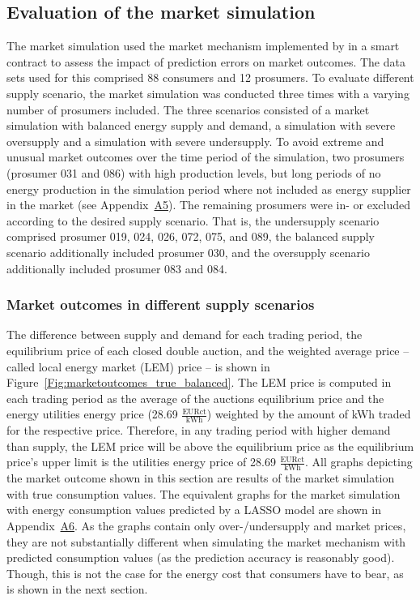 
\subsection{Evaluation of the market simulation}\label{Sec:Results;Subsec:Simulation}

The market simulation used the market mechanism implemented by \citet{Mengelkamp:2018a} in a smart contract to assess the impact of prediction errors on market outcomes. The data sets used for this comprised 88 consumers and 12 prosumers. To evaluate different supply scenario, the market simulation was conducted three times with a varying number of prosumers included. The three scenarios consisted of a market simulation with balanced energy supply and demand, a simulation with severe oversupply and a simulation with severe undersupply. To avoid extreme and unusual market outcomes over the time period of the simulation, two prosumers (prosumer 031 and 086) with high production levels, but long periods of no energy production in the simulation period where not included as energy supplier in the market (see Appendix~\hyperlink{AppA5:Figures:producer_all}{A5}). The remaining prosumers were in- or excluded according to the desired supply scenario. That is, the undersupply scenario comprised prosumer 019, 024, 026, 072, 075, and 089, the balanced supply scenario additionally included prosumer 030, and the oversupply scenario additionally included prosumer 083 and 084.

\subsubsection{Market outcomes in different supply scenarios}

The difference between supply and demand for each trading period, the equilibrium price of each closed double auction, and the weighted average price -- called local energy market (LEM) price -- is shown in Figure~\ref{Fig:marketoutcomes_true_balanced}. The LEM price is computed in each trading period as the average of the auctions equilibrium price and the energy utilities energy price (28.69 $\frac{\text{EURct}}{\text{kWh}}$) weighted by the amount of kWh traded for the respective price. Therefore, in any trading period with higher demand than supply, the LEM price will be above the equilibrium price as the equilibrium price's upper limit is the utilities energy price of 28.69 $\frac{\text{EURct}}{\text{kWh}}$. All graphs depicting the market outcome shown in this section are results of the market simulation with true consumption values. The equivalent graphs for the market simulation with energy consumption values predicted by a LASSO model are shown in Appendix~\hyperlink{AppA6:Figures:marketsimulation_pred}{A6}. As the graphs contain only over-/undersupply and market prices, they are not substantially different when simulating the market mechanism with predicted consumption values (as the prediction accuracy is reasonably good). Though, this is not the case for the energy cost that consumers have to bear, as is shown in the next section.

